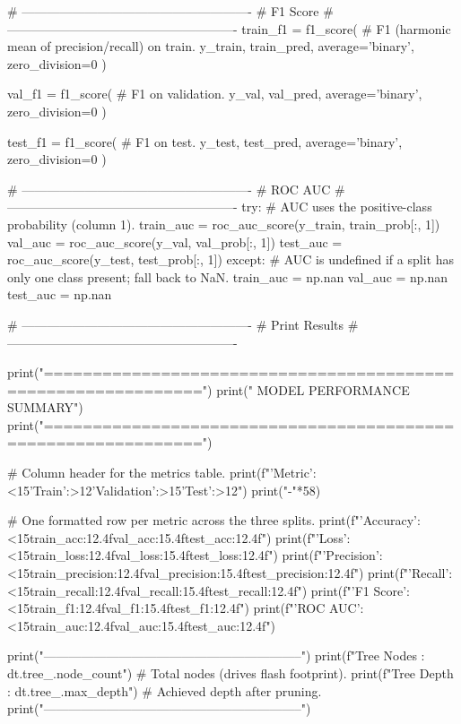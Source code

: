     # -------------------------------------------------------
    # F1 Score
    # -------------------------------------------------------
    train_f1 = f1_score(                   # F1 (harmonic mean of precision/recall) on train.
        y_train, train_pred,
        average='binary',
        zero_division=0
    )

    val_f1 = f1_score(                     # F1 on validation.
        y_val, val_pred,
        average='binary',
        zero_division=0
    )

    test_f1 = f1_score(                    # F1 on test.
        y_test, test_pred,
        average='binary',
        zero_division=0
    )

    # -------------------------------------------------------
    # ROC AUC
    # -------------------------------------------------------
    try:
        # AUC uses the positive-class probability (column 1).
        train_auc = roc_auc_score(y_train, train_prob[:, 1])
        val_auc = roc_auc_score(y_val, val_prob[:, 1])
        test_auc = roc_auc_score(y_test, test_prob[:, 1])
    except:
        # AUC is undefined if a split has only one class present; fall back to NaN.
        train_auc = np.nan
        val_auc = np.nan
        test_auc = np.nan

    # -------------------------------------------------------
    # Print Results
    # -------------------------------------------------------

    print("\n==============================================================")
    print("               MODEL PERFORMANCE SUMMARY")
    print("==============================================================")

    # Column header for the metrics table.
    print(f"{'Metric':<15}{'Train':>12}{'Validation':>15}{'Test':>12}")
    print("-"*58)

    # One formatted row per metric across the three splits.
    print(f"{'Accuracy':<15}{train_acc:12.4f}{val_acc:15.4f}{test_acc:12.4f}")
    print(f"{'Loss':<15}{train_loss:12.4f}{val_loss:15.4f}{test_loss:12.4f}")
    print(f"{'Precision':<15}{train_precision:12.4f}{val_precision:15.4f}{test_precision:12.4f}")
    print(f"{'Recall':<15}{train_recall:12.4f}{val_recall:15.4f}{test_recall:12.4f}")
    print(f"{'F1 Score':<15}{train_f1:12.4f}{val_f1:15.4f}{test_f1:12.4f}")
    print(f"{'ROC AUC':<15}{train_auc:12.4f}{val_auc:15.4f}{test_auc:12.4f}")

    print("\n--------------------------------------------------------------")
    print(f"Tree Nodes : {dt.tree_.node_count}")   # Total nodes (drives flash footprint).
    print(f"Tree Depth : {dt.tree_.max_depth}")    # Achieved depth after pruning.
    print("--------------------------------------------------------------")


